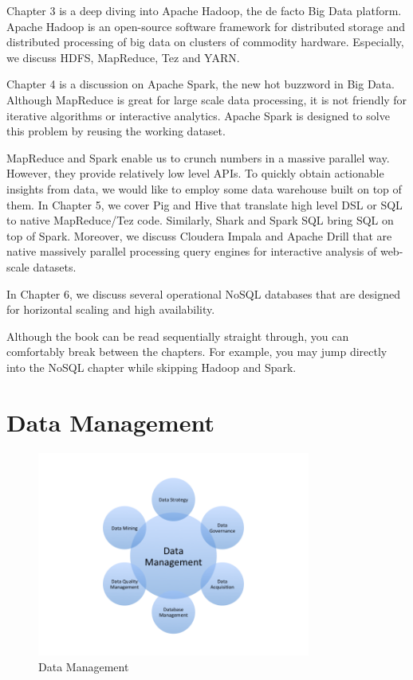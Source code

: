 \documentclass[11pt]{book}
\begin{document}
Chapter 3 is a deep diving into Apache Hadoop, the de facto Big Data platform. Apache Hadoop is an open-source software framework for distributed storage and distributed processing of big data on clusters of commodity hardware. Especially, we discuss HDFS, MapReduce, Tez and YARN.

Chapter 4 is a discussion on Apache Spark, the new hot buzzword in Big Data. Although MapReduce is great for large scale data processing, it is not friendly for iterative algorithms or interactive analytics. Apache Spark is designed to solve this problem by reusing the working dataset. 

MapReduce and Spark enable us to crunch numbers in a massive parallel way. However, they provide relatively low level APIs. To quickly obtain actionable insights from data, we would like to employ some data warehouse built on top of them. In Chapter 5, we cover Pig and Hive that translate high level DSL or SQL to native MapReduce/Tez code. Similarly, Shark and Spark SQL bring SQL on top of Spark. Moreover, we discuss Cloudera Impala and Apache Drill that are native massively parallel processing query engines for interactive analysis of web-scale datasets. 

In Chapter 6, we discuss several operational NoSQL databases that are designed for horizontal scaling and high availability.

Although the book can be read sequentially straight through, you can comfortably break between the chapters. For example, you may jump directly into the NoSQL chapter while skipping Hadoop and Spark. 

\chapter{Data Management}
\begin{figure}[t]
\includegraphics[width=0.8\textwidth]{images/data-management.png}
\centering
\caption{Data Management}
\end{figure}
\end{document}

